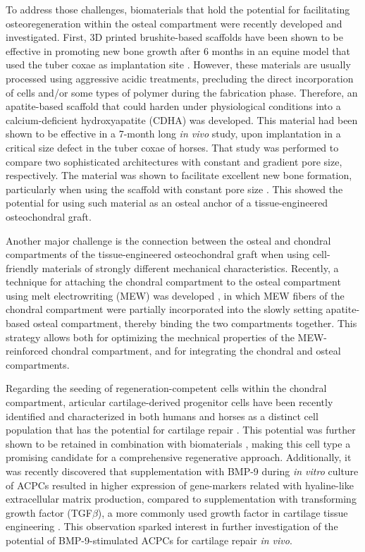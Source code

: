\documentclass[twocolumn, empirical, authordate, issue]{jote-new-article}
\begin{document}
To address those challenges, biomaterials that hold the potential for facilitating osteoregeneration within the osteal compartment were recently developed and investigated. First, 3D printed brushite-based scaffolds have been shown to be effective in promoting new bone growth after 6 months in an equine model that used the tuber coxae as implantation site \parencite{VindasBolanos2020}. However, these materials are usually processed using aggressive acidic treatments, precluding the direct incorporation of cells and/or some types of polymer during the fabrication phase. Therefore, an apatite-based scaffold that could harden under physiological conditions into a calcium-deficient hydroxyapatite (CDHA) was developed. This material had been shown to be effective in a 7-month long \emph{in vivo} study, upon implantation in a critical size defect in the tuber coxae of horses. That study was performed to compare two sophisticated architectures with constant and gradient pore size, respectively. The material was shown to facilitate excellent new bone formation, particularly when using the scaffold with constant pore size \parencite{Diloksumpan2020a}. This showed the potential for using such material as an osteal anchor of a tissue-engineered osteochondral graft.

Another major challenge is the connection between the osteal and chondral compartments of the tissue-engineered osteochondral graft when using cell-friendly materials of strongly different mechanical characteristics. Recently, a technique for attaching the chondral compartment to the osteal compartment using melt electrowriting (MEW) was developed \parencite{Diloksumpan2020}, in which MEW fibers of the chondral compartment were partially incorporated into the slowly setting apatite-based osteal compartment, thereby binding the two compartments together. This strategy allows both for optimizing the mechnical properties of the MEW-reinforced chondral compartment, and for integrating the chondral and osteal compartments.

Regarding the seeding of regeneration-competent cells within the chondral compartment, articular cartilage-derived progenitor cells have been recently identified and characterized in both humans and horses as a distinct cell population that has the potential for cartilage repair \parencite{McCarthy2012, Williams2010}. This potential was further shown to be retained in combination with biomaterials \parencite{Frisbie2015, Levato2017}, making this cell type a promising candidate for a comprehensive regenerative approach. Additionally, it was recently discovered that supplementation with BMP-9 during \emph{in vitro} culture of ACPCs resulted in higher expression of gene-markers related with hyaline-like extracellular matrix production, compared to supplementation with transforming growth factor (TGF$\beta$), a more commonly used growth factor in cartilage tissue engineering \parencite{Morgan2020}. This observation sparked interest in further investigation of the potential of BMP-9-stimulated ACPCs for cartilage repair \emph{in vivo}.
\end{document}
